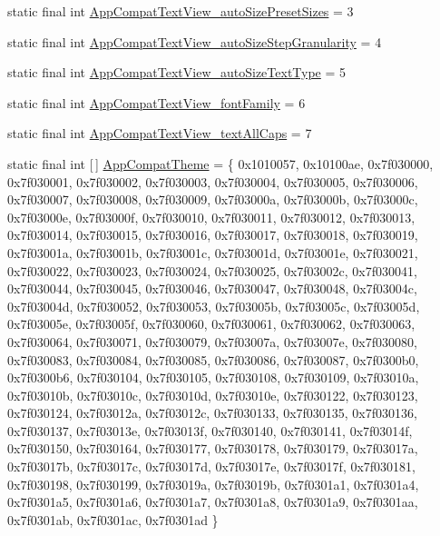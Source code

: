 \begin{DoxyCompactItemize}
\item 
static final int \mbox{\hyperlink{classandroid_1_1support_1_1v7_1_1appcompat_1_1_r_1_1styleable_ae4bce7d18b476a438eadda6174d423d6}{App\+Compat\+Text\+View\+\_\+auto\+Size\+Preset\+Sizes}} = 3
\item 
static final int \mbox{\hyperlink{classandroid_1_1support_1_1v7_1_1appcompat_1_1_r_1_1styleable_a00ceb02e6607ab5a8647a0bde31d0886}{App\+Compat\+Text\+View\+\_\+auto\+Size\+Step\+Granularity}} = 4
\item 
static final int \mbox{\hyperlink{classandroid_1_1support_1_1v7_1_1appcompat_1_1_r_1_1styleable_a2a4cfbddafe8f9631e4601bc88a22ec0}{App\+Compat\+Text\+View\+\_\+auto\+Size\+Text\+Type}} = 5
\item 
static final int \mbox{\hyperlink{classandroid_1_1support_1_1v7_1_1appcompat_1_1_r_1_1styleable_a946326a59dbc73e28494b7f31003892e}{App\+Compat\+Text\+View\+\_\+font\+Family}} = 6
\item 
static final int \mbox{\hyperlink{classandroid_1_1support_1_1v7_1_1appcompat_1_1_r_1_1styleable_a25380302d2eae707e18a64b87eb2d4aa}{App\+Compat\+Text\+View\+\_\+text\+All\+Caps}} = 7
\item 
static final int \mbox{[}$\,$\mbox{]} \mbox{\hyperlink{classandroid_1_1support_1_1v7_1_1appcompat_1_1_r_1_1styleable_a5c42f89e8a410c323be34208d75c430b}{App\+Compat\+Theme}} = \{ 0x1010057, 0x10100ae, 0x7f030000, 0x7f030001, 0x7f030002, 0x7f030003, 0x7f030004, 0x7f030005, 0x7f030006, 0x7f030007, 0x7f030008, 0x7f030009, 0x7f03000a, 0x7f03000b, 0x7f03000c, 0x7f03000e, 0x7f03000f, 0x7f030010, 0x7f030011, 0x7f030012, 0x7f030013, 0x7f030014, 0x7f030015, 0x7f030016, 0x7f030017, 0x7f030018, 0x7f030019, 0x7f03001a, 0x7f03001b, 0x7f03001c, 0x7f03001d, 0x7f03001e, 0x7f030021, 0x7f030022, 0x7f030023, 0x7f030024, 0x7f030025, 0x7f03002c, 0x7f030041, 0x7f030044, 0x7f030045, 0x7f030046, 0x7f030047, 0x7f030048, 0x7f03004c, 0x7f03004d, 0x7f030052, 0x7f030053, 0x7f03005b, 0x7f03005c, 0x7f03005d, 0x7f03005e, 0x7f03005f, 0x7f030060, 0x7f030061, 0x7f030062, 0x7f030063, 0x7f030064, 0x7f030071, 0x7f030079, 0x7f03007a, 0x7f03007e, 0x7f030080, 0x7f030083, 0x7f030084, 0x7f030085, 0x7f030086, 0x7f030087, 0x7f0300b0, 0x7f0300b6, 0x7f030104, 0x7f030105, 0x7f030108, 0x7f030109, 0x7f03010a, 0x7f03010b, 0x7f03010c, 0x7f03010d, 0x7f03010e, 0x7f030122, 0x7f030123, 0x7f030124, 0x7f03012a, 0x7f03012c, 0x7f030133, 0x7f030135, 0x7f030136, 0x7f030137, 0x7f03013e, 0x7f03013f, 0x7f030140, 0x7f030141, 0x7f03014f, 0x7f030150, 0x7f030164, 0x7f030177, 0x7f030178, 0x7f030179, 0x7f03017a, 0x7f03017b, 0x7f03017c, 0x7f03017d, 0x7f03017e, 0x7f03017f, 0x7f030181, 0x7f030198, 0x7f030199, 0x7f03019a, 0x7f03019b, 0x7f0301a1, 0x7f0301a4, 0x7f0301a5, 0x7f0301a6, 0x7f0301a7, 0x7f0301a8, 0x7f0301a9, 0x7f0301aa, 0x7f0301ab, 0x7f0301ac, 0x7f0301ad \}

\end{DoxyCompactItemize}

